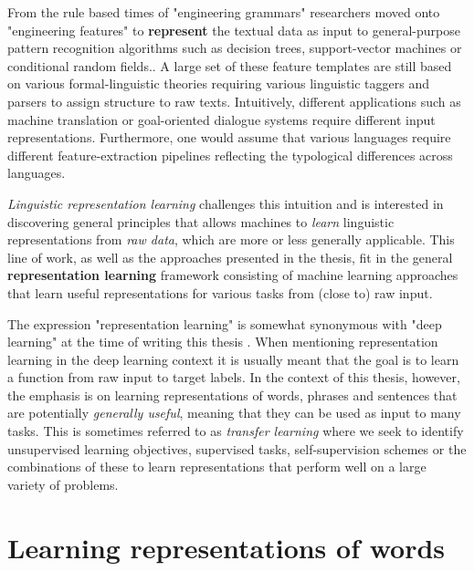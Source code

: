 From the rule based times of "engineering grammars" researchers moved onto "engineering features"
to \textbf{represent} the textual data as input to general-purpose pattern recognition algorithms such as
decision trees, support-vector machines or conditional random fields..
A large set of these feature templates are still based on various formal-linguistic theories requiring various
linguistic taggers and parsers to assign structure to raw texts.
Intuitively, different applications such as machine translation or goal-oriented dialogue systems
require different input representations. Furthermore, one would assume that various languages require
different feature-extraction pipelines reflecting the typological differences across languages.

\emph{Linguistic representation learning} challenges this intuition and is interested in
discovering general principles that allows machines to  \emph{learn}
linguistic representations from \emph{raw data}, which are more or less
generally applicable. This line of work, as well as the approaches presented in the thesis,
fit in the general \textbf{representation learning}  framework consisting of
machine learning approaches that learn useful representations
for various tasks from (close to) raw input.

The expression "representation learning" is somewhat synonymous with "deep learning" at the time
of writing this thesis \citep{bengio2013representation}.
When mentioning representation learning in the deep learning context
it is usually meant that the goal is to learn a function from raw input to target labels. In the
context of this thesis, however, the emphasis is on learning representations of words, phrases and
sentences that are potentially \emph{generally useful}, meaning
that they can be used as input to many tasks. This is sometimes referred to as
\emph{transfer learning} \citep{pratt1993discriminability} 
where we seek to identify unsupervised learning objectives,
supervised tasks, self-supervision schemes or the combinations of these to  learn representations that
perform well on a large variety of problems.

\section{Learning representations of words}


